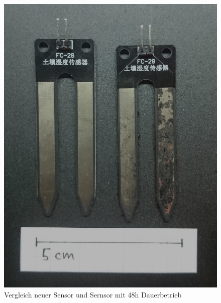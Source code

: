 ﻿\documentclass[]{IEEEtran}
\begin{document}
\begin{figure}[!h]
	\centering
	\includegraphics[width=0.8\linewidth]{bilder/_fechtesensorVergleich0.jpg}
	\caption{Vergleich neuer Sensor und Sernsor mit 48h Dauerbetrieb}
	\label{fig-SensorVergleich}
\end{figure}
\end{document}
